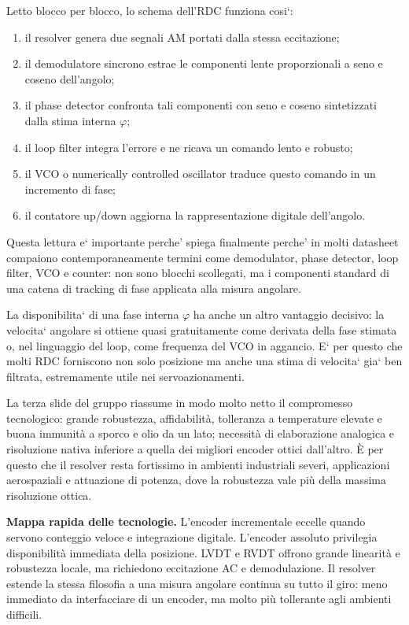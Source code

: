 \documentclass[11pt,a4paper]{article}
\begin{document}
Letto blocco per blocco, lo schema dell’RDC funziona cosi`:
\begin{enumerate}[leftmargin=1.5em]
\item il resolver genera due segnali AM portati dalla stessa eccitazione;
\item il demodulatore sincrono estrae le componenti lente proporzionali a seno e coseno dell’angolo;
\item il phase detector confronta tali componenti con seno e coseno sintetizzati dalla stima interna \(\varphi\);
\item il loop filter integra l’errore e ne ricava un comando lento e robusto;
\item il VCO o numerically controlled oscillator traduce questo comando in un incremento di fase;
\item il contatore up/down aggiorna la rappresentazione digitale dell’angolo.
\end{enumerate}

Questa lettura e` importante perche' spiega finalmente perche' in molti datasheet compaiono contemporaneamente termini come demodulator, phase detector, loop filter, VCO e counter: non sono blocchi scollegati, ma i componenti standard di una catena di tracking di fase applicata alla misura angolare.

La disponibilita` di una fase interna \(\varphi\) ha anche un altro vantaggio decisivo: la velocita` angolare si ottiene quasi gratuitamente come derivata della fase stimata o, nel linguaggio del loop, come frequenza del VCO in aggancio. E` per questo che molti RDC forniscono non solo posizione ma anche una stima di velocita` gia` ben filtrata, estremamente utile nei servoazionamenti.

La terza slide del gruppo riassume in modo molto netto il compromesso tecnologico: grande robustezza, affidabilità, tolleranza a temperature elevate e buona immunità a sporco e olio da un lato; necessità di elaborazione analogica e risoluzione nativa inferiore a quella dei migliori encoder ottici dall’altro. È per questo che il resolver resta fortissimo in ambienti industriali severi, applicazioni aerospaziali e attuazione di potenza, dove la robustezza vale più della massima risoluzione ottica.

\begin{keybox}
\textbf{Mappa rapida delle tecnologie.} L’encoder incrementale eccelle quando servono conteggio veloce e integrazione digitale. L’encoder assoluto privilegia disponibilità immediata della posizione. LVDT e RVDT offrono grande linearità e robustezza locale, ma richiedono eccitazione AC e demodulazione. Il resolver estende la stessa filosofia a una misura angolare continua su tutto il giro: meno immediato da interfacciare di un encoder, ma molto più tollerante agli ambienti difficili.
\end{keybox}
\end{document}
